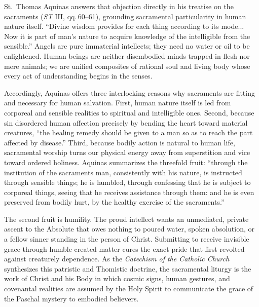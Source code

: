 St.\ Thomas Aquinas answers that objection directly in his treatise on the sacraments (\textit{ST} III, qq.\,60--61), grounding sacramental particularity in human nature itself. ``Divine wisdom provides for each thing according to its mode... Now it is part of man's nature to acquire knowledge of the intelligible from the sensible.'' Angels are pure immaterial intellects; they need no water or oil to be enlightened. Human beings are neither disembodied minds trapped in flesh nor mere animals; we are unified composites of rational soul and living body whose every act of understanding begins in the senses.

Accordingly, Aquinas offers three interlocking reasons why sacraments are fitting and necessary for human salvation. First, human nature itself is led from corporeal and sensible realities to spiritual and intelligible ones. Second, because sin disordered human affection precisely by bending the heart toward material creatures, ``the healing remedy should be given to a man so as to reach the part affected by disease.'' Third, because bodily action is natural to human life, sacramental worship turns our physical energy away from superstition and vice toward ordered holiness. Aquinas summarizes the threefold fruit: ``through the institution of the sacraments man, consistently with his nature, is instructed through sensible things; he is humbled, through confessing that he is subject to corporeal things, seeing that he receives assistance through them: and he is even preserved from bodily hurt, by the healthy exercise of the sacraments.''

The second fruit is humility. The proud intellect wants an unmediated, private ascent to the Absolute that owes nothing to poured water, spoken absolution, or a fellow sinner standing in the person of Christ. Submitting to receive invisible grace through humble created matter cures the exact pride that first revolted against creaturely dependence. As the \textit{Catechism of the Catholic Church} synthesizes this patristic and Thomistic doctrine, the sacramental liturgy is the work of Christ and his Body in which cosmic signs, human gestures, and covenantal realities are assumed by the Holy Spirit to communicate the grace of the Paschal mystery to embodied believers.

